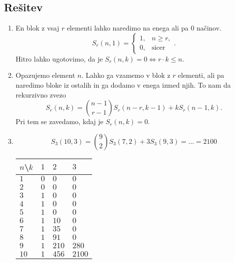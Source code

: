 \documentclass[11pt]{article}
\begin{document}
\subsection*{Rešitev}
\begin{enumerate}[label=(\alph*)]
    \item En blok z vsaj \(r\) elementi lahko naredimo na enega ali pa \(0\) načinov. 
    \[S_r\left(n, 1\right) = \begin{cases}
        1, & n \ge r, \\
        0, & \text{sicer}
    \end{cases}.\]
    Hitro lahko ugotovimo, da je \(S_r\left(n, k\right) = 0 \Leftrightarrow r\cdot k \le n\).
    \item Opazujemo element \(n\). Lahko ga vzamemo v blok z \(r\) elementi, ali pa naredimo bloke iz
        ostalih in ga dodamo v enega izmed njih. To nam da rekurzivno zvezo
        \[S_r\left(n, k\right) = \binom{n - 1}{r - 1} S_r\left(n - r, k - 1\right) + k S_r\left(n - 1, k\right).\]
        Pri tem se zavedamo, kdaj je \(S_r\left(n, k\right) = 0\).
    \item \[S_3\left(10, 3\right) = \binom{9}{2} S_3\left(7, 2\right) + 3 S_3\left(9, 3\right) = \ldots = 2100 \]
    \begin{table}[!h]
        \centering
        \begin{tabular}{|p{}|p{}|p{}|p{}|}
            \hline 
            $\displaystyle n$\textbackslash$\displaystyle k$ & $\displaystyle 1$ & $\displaystyle 2$ & $\displaystyle 3$ \\
            \hline 
            $\displaystyle 1$ & $\displaystyle 0$ & $\displaystyle 0$ & $\displaystyle 0$ \\
            \hline 
            $\displaystyle 2$ & $\displaystyle 0$ & $\displaystyle 0$ & $\displaystyle 0$ \\
            \hline 
            $\displaystyle 3$ & $\displaystyle 1$ & $\displaystyle 0$ & $\displaystyle 0$ \\
            \hline 
            $\displaystyle 4$ & $\displaystyle 1$ & $\displaystyle 0$ & $\displaystyle 0$ \\
            \hline 
            $\displaystyle 5$ & $\displaystyle 1$ & $\displaystyle 0$ & $\displaystyle 0$ \\
            \hline 
            $\displaystyle 6$ & $\displaystyle 1$ & $\displaystyle 10$ & $\displaystyle 0$ \\
            \hline 
            $\displaystyle 7$ & $\displaystyle 1$ & $\displaystyle 35$ & $\displaystyle 0$ \\
            \hline 
            $\displaystyle 8$ & $\displaystyle 1$ & $\displaystyle 91$ & $\displaystyle 0$ \\
            \hline 
            $\displaystyle 9$ & $\displaystyle 1$ & $\displaystyle 210$ & $\displaystyle 280$ \\
            \hline 
            $\displaystyle 10$ & $\displaystyle 1$ & $\displaystyle 456$ & $\displaystyle 2100$ \\
            \hline
        \end{tabular}
    \end{table}
\end{enumerate}
\end{document}
